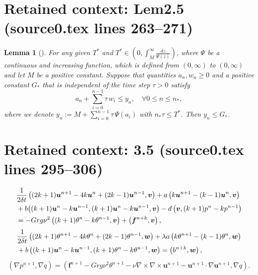 \documentclass[10pt,a4paper]{amsart}
\theoremstyle{thmm}
\newtheorem{lemma}{Lemma}[section]
\begin{document}
\section*{Retained context: Lem2.5 (source0.tex lines 263--271)}

	\begin{lemma}[\cite{J2010}]\label{Lem2.5}
		{\it For any given  \(T^*\) and $T^*\in(0,\int_{M}^{\infty} \frac{dz}{\Psi(z)})$, where $\Psi$  be a continuous and increasing function, which is defined from $(0, \infty) $ to $ (0, \infty)$ and let \(M \) be a positive constant.  
			Suppose that quantities \(a_n, w_n \geq 0\) and a positive constant  \(G_* \) that is independent of the time step  \(\tau > 0\) satisfy 
			\[
			a_n + \sum_{i = 0}^{n - 1} \tau \, w_i \leq y_n , \quad\forall 0\leq n \leq n_*,
			\]
			where we denote $y_n := M + \sum_{i = 0}^{n - 1} \tau \, \Psi(a_i)$
			with \(n_* \tau \leq T^*\). Then \(y_n \leq G_*\).} 
	\end{lemma}


\section*{Retained context: 3.5 (source0.tex lines 295--306)}

	\begin{align}\label{3.5}
		& \frac{1}{2\delta t}\left( (2k+1)\bm{u}^{n+1} - 4k\bm{u}^{n} + (2k-1)\bm{u}^{n-1}, \bm{v} \right) + a\left(k\bm{u}^{n+1} - (k-1)\bm{u}^n, \bm{v}\right)\notag\\
		&  +b\big((k+1)\bm{u}^n - k\bm{u}^{n-1},{ (k+1)\bm{u}^n - k\bm{u}^{n-1}},\bm{v}\big) - d\left(\bm{v}, (k+1)p^n - kp^{n-1}\right)\notag\\
		&  = -Grg\nu^2\left( (k+1)\theta^n - k\theta^{n-1}, \bm{v} \right)+ \left( \bm{f}^{n+k}, \bm{v} \right),
	\end{align}
	\begin{align}\label{3.6}
		& \frac{1}{2\delta t}\left( (2k+1)\theta^{n+1} - 4k\theta^{n} + (2k-1)\theta^{n-1}, \bm{w} \right) + \lambda a\left(k\theta^{n+1} - (k-1)\theta^n, \bm{w}\right)\notag\\
		&   + b\left((k+1)\bm{u}^n - k\bm{u}^{n-1}, { (k+1)\theta^{n} - k\theta^{n-1}}, \bm{w}\right) = \left(b^{n+k}, \bm{w} \right),
	\end{align}
	\begin{align}\label{3.7}
		(\nabla\mathit{p}^{n+1},\nabla\mathit{q})=(\bm{f}^{n+1}-Grg\nu^2\theta^{n+1}-\nu\nabla\times\nabla\times\bm{u}^{n+1}-\bm{u}^{n+1}\cdot\nabla\bm{u}^{n+1},\nabla\mathit{q}).
	\end{align}
\end{document}

